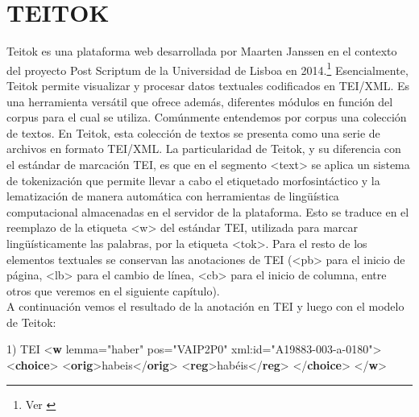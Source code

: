 \documentclass[
]{book}
\newenvironment{Shaded}{\begin{snugshade}}{\end{snugshade}}
\newcommand{\KeywordTok}[1]{\textcolor[rgb]{0.13,0.29,0.53}{\textbf{#1}}}
\newcommand{\NormalTok}[1]{#1}
\newcommand{\OtherTok}[1]{\textcolor[rgb]{0.56,0.35,0.01}{#1}}
\newcommand{\StringTok}[1]{\textcolor[rgb]{0.31,0.60,0.02}{#1}}
\begin{document}
\hypertarget{teitok}{%
\chapter*{TEITOK}\label{teitok}}

Teitok es una plataforma web desarrollada por Maarten Janssen \citep{janssen2016teitok} en el contexto del proyecto
Post Scriptum de la Universidad de Lisboa en 2014.\footnote{Ver \citet{vaamonde2015ps}}
Esencialmente, Teitok permite visualizar y procesar datos textuales codificados en TEI/XML. Es una herramienta versátil que ofrece además, diferentes módulos en función del corpus para el cual se utiliza.
Comúnmente entendemos por corpus una colección de textos. En Teitok, esta colección de textos se presenta como una serie de archivos en formato TEI/XML. La particularidad de Teitok, y su diferencia con el estándar de marcación TEI, es que en el segmento { \textless text\textgreater{} } se aplica un sistema de {tokenización} que permite llevar a cabo el etiquetado morfosintáctico y la lematización de manera automática con herramientas de lingüística computacional almacenadas en el servidor de la plataforma. Esto se traduce en el reemplazo de la etiqueta { \textless w\textgreater{} } del estándar TEI, utilizada para marcar lingüísticamente las palabras, por la etiqueta { \textless tok\textgreater.} Para el resto de los elementos textuales se conservan las anotaciones de TEI ({\textless pb\textgreater{} }para el inicio de página, {\textless lb\textgreater{} } para el cambio de línea, { \textless cb\textgreater{} }para el inicio de columna, entre otros que veremos en el siguiente capítulo).\\
A continuación vemos el resultado de la anotación en TEI y luego con el modelo de Teitok:

\begin{Shaded}
\begin{Highlighting}[]
\NormalTok{1) TEI}
\NormalTok{\textless{}}\KeywordTok{w}\OtherTok{ lemma=}\StringTok{"haber"}\OtherTok{ pos=}\StringTok{"VAIP2P0"}
\OtherTok{  xml:id=}\StringTok{"A19883{-}003{-}a{-}0180"}\NormalTok{\textgreater{}}
\NormalTok{  \textless{}}\KeywordTok{choice}\NormalTok{\textgreater{}}
\NormalTok{   \textless{}}\KeywordTok{orig}\NormalTok{\textgreater{}habeis\textless{}/}\KeywordTok{orig}\NormalTok{\textgreater{}}
\NormalTok{   \textless{}}\KeywordTok{reg}\NormalTok{\textgreater{}habéis\textless{}/}\KeywordTok{reg}\NormalTok{\textgreater{}}
\NormalTok{  \textless{}/}\KeywordTok{choice}\NormalTok{\textgreater{}}
\NormalTok{ \textless{}/}\KeywordTok{w}\NormalTok{\textgreater{}}
\end{Highlighting}
\end{Shaded}
\end{document}
